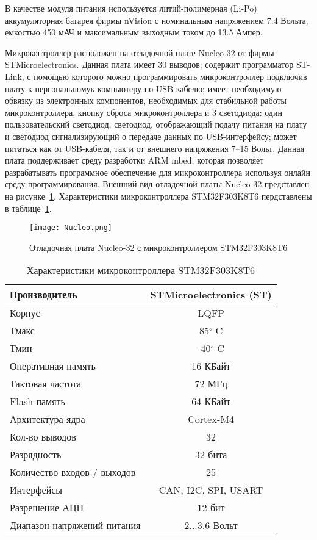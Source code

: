 В качестве модуля питания используется литий-полимерная (Li-Po) аккумуляторная батарея фирмы nVision с номинальным напряжением 7.4 Вольта, емкостью 450 мАЧ и максимальным выходным током до 13.5 Ампер.


Микроконтроллер расположен на отладочной плате Nucleo-32 от фирмы STMicroelectronics. Данная плата имеет 30 выводов; содержит программатор ST-Link, с помощью которого можно программировать микроконтроллер подключив плату к персональномук компьютеру по USB-кабелю; имеет необходимую обвязку из электронных компонентов, необходимых для стабильной работы микроконтроллера, кнопку сброса микроконтроллера и 3 светодиода: один пользовательский светодиод, светодиод, отображающий подачу питания на плату и светодиод сигнализирующий о передаче данных по USB-интерфейсу; может питаться как от USB-кабеля, так и от внешнего напряжения 7--15 Вольт. Данная плата поддерживает среду разработки ARM mbed, которая позволяет разрабатывать программное обеспечение для микроконтроллера используя онлайн среду программирования. Внешний вид отладочной платы Nucleo-32 представлен на рисунке~\ref{Nucleo}. Характеристики микроконтроллера STM32F303K8T6 пердставлены в таблице~\ref{tabStm}.

\begin{figure}[h]
	\centering
	\texttt{[image: Nucleo.png]}%
	\caption{Отладочная плата Nucleo-32 с микроконтроллером STM32F303K8T6}
	\label{Nucleo}
\end{figure}

\begin{table}[h]
	\centering
	\caption{Характеристики микроконтроллера STM32F303K8T6}\label{tabStm}
	\begin{tabular}{|l|c|}
		\hline
		Производитель &	STMicroelectronics (ST) \\ \hline
		Корпус 	& LQFP \\ \hline
		Тмакс	&	85$^\circ$ C 	\\ \hline
		Тмин 	&	-40$^\circ$ C \\ \hline
		Оперативная память 	& 16 КБайт\\ \hline
		Тактовая частота	& 72 МГц 	\\ \hline
		Flash память & 64 КБайт\\ \hline
		Архитектура ядра & Cortex-M4	\\ \hline
		Кол-во выводов 	& 32\\ \hline
		Разрядность	& 32 бита\\ \hline
		Количество входов / выходов & 25	\\ \hline
		Интерфейсы 	& CAN, I2C, SPI, USART\\ \hline
		Разрешение АЦП & 12 бит\\ \hline
		Диапазон напряжений питания 	& 2...3.6 Вольт\\ \hline		
	\end{tabular}
\end{table}


